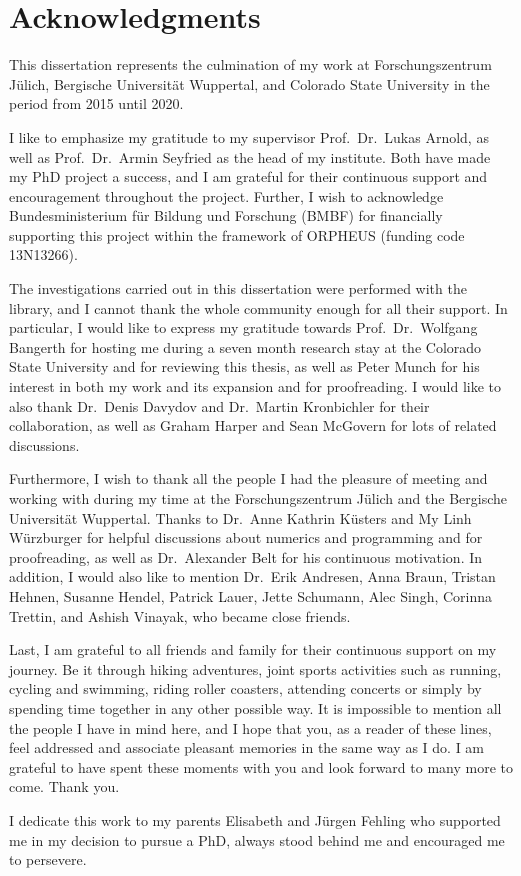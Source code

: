 \section*{\centering Acknowledgments}

This dissertation represents the culmination of my work at Forschungszentrum Jülich, Bergische Universität Wuppertal, and Colorado State University in the period from 2015 until 2020.

I like to emphasize my gratitude to my supervisor Prof.\ Dr.\ Lukas Arnold, as well as Prof.\ Dr.\ Armin Seyfried as the head of my institute. Both have made my PhD project a success, and I am grateful for their continuous support and encouragement throughout the project. %
Further, I wish to acknowledge Bundesministerium für Bildung und Forschung (BMBF) for financially supporting this project within the framework of ORPHEUS (funding code 13N13266).

The investigations carried out in this dissertation were performed with the \dealii{} library, and I cannot thank the whole \dealii{} community enough for all their support. In particular, I would like to express my gratitude towards Prof.\ Dr.\ Wolfgang Bangerth for hosting me during a seven month research stay at the Colorado State University and for reviewing this thesis, as well as Peter Munch for his interest in both my work and its expansion and for proofreading. I would like to also thank Dr.\ Denis Davydov and Dr.\ Martin Kronbichler for their collaboration, as well as Graham Harper and Sean McGovern for lots of \dealii{} related discussions.

Furthermore, I wish to thank all the people I had the pleasure of meeting and working with during my time at the Forschungszentrum Jülich and the Bergische Universität Wuppertal. Thanks to Dr.\ Anne Kathrin Küsters and My Linh Würzburger for helpful discussions about numerics and programming and for proofreading, as well as Dr.\ Alexander Belt for his continuous motivation. In addition, I would also like to mention Dr.\ Erik Andresen, Anna Braun, Tristan Hehnen, Susanne Hendel, Patrick Lauer, Jette Schumann, Alec Singh, Corinna Trettin, and Ashish Vinayak, who became close friends.

Last, I am grateful to all friends and family for their continuous support on my journey. Be it through hiking adventures, joint sports activities such as running, cycling and swimming, riding roller coasters, attending concerts or simply by spending time together in any other possible way. It is impossible to mention all the people I have in mind here, and I hope that you, as a reader of these lines, feel addressed and associate pleasant memories in the same way as I do. I am grateful to have spent these moments with you and look forward to many more to come. Thank you.

I dedicate this work to my parents Elisabeth and Jürgen Fehling who supported me in my decision to pursue a PhD, always stood behind me and encouraged me to persevere.